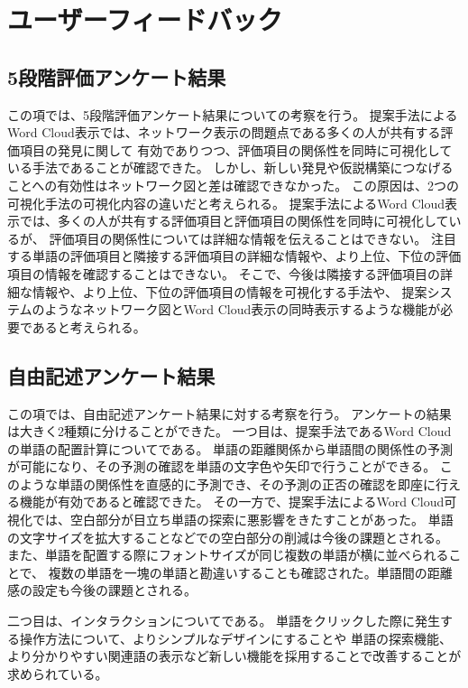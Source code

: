 \documentclass[syuuron]{kuee}
\begin{document}
	\section{ユーザーフィードバック}
		\subsection{5段階評価アンケート結果}
		この項では、5段階評価アンケート結果についての考察を行う。
		提案手法によるWord Cloud表示では、ネットワーク表示の問題点である多くの人が共有する評価項目の発見に関して
		有効でありつつ、評価項目の関係性を同時に可視化している手法であることが確認できた。
		しかし、新しい発見や仮説構築につなげることへの有効性はネットワーク図と差は確認できなかった。
		この原因は、2つの可視化手法の可視化内容の違いだと考えられる。
		提案手法によるWord Cloud表示では、多くの人が共有する評価項目と評価項目の関係性を同時に可視化しているが、
		評価項目の関係性については詳細な情報を伝えることはできない。
		注目する単語の評価項目と隣接する評価項目の詳細な情報や、より上位、下位の評価項目の情報を確認することはできない。
		そこで、今後は隣接する評価項目の詳細な情報や、より上位、下位の評価項目の情報を可視化する手法や、
		提案システムのようなネットワーク図とWord Cloud表示の同時表示するような機能が必要であると考えられる。
		
		\subsection{自由記述アンケート結果}
		この項では、自由記述アンケート結果に対する考察を行う。
		アンケートの結果は大きく2種類に分けることができた。
		一つ目は、提案手法であるWord Cloudの単語の配置計算についてである。
		単語の距離関係から単語間の関係性の予測が可能になり、その予測の確認を単語の文字色や矢印で行うことができる。
		このような単語の関係性を直感的に予測でき、その予測の正否の確認を即座に行える機能が有効であると確認できた。
		その一方で、提案手法によるWord Cloud可視化では、空白部分が目立ち単語の探索に悪影響をきたすことがあった。
		単語の文字サイズを拡大することなどでの空白部分の削減は今後の課題とされる。
		また、単語を配置する際にフォントサイズが同じ複数の単語が横に並べられることで、
		複数の単語を一塊の単語と勘違いすることも確認された。単語間の距離感の設定も今後の課題とされる。
	
		二つ目は、インタラクションについてである。
		単語をクリックした際に発生する操作方法について、よりシンプルなデザインにすることや
		単語の探索機能、より分かりやすい関連語の表示など新しい機能を採用することで改善することが求められている。
	
\end{document}
